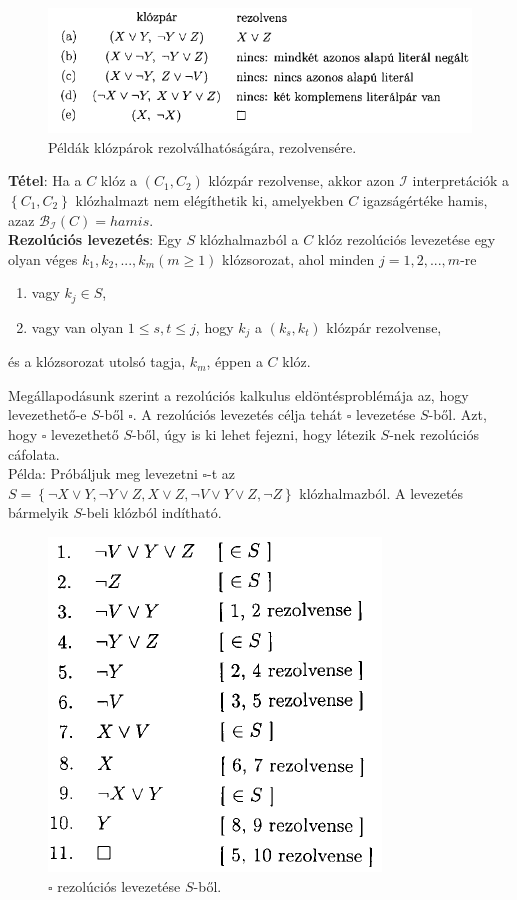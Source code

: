 \documentclass[margin=0px]{article}
\begin{document}
	\begin{figure}[H]
		\centering
		\includegraphics[width=0.7\linewidth]{img/rezolvens}
		\caption{Példák klózpárok rezolválhatóságára, rezolvensére.}
		\label{fig:rezolvens}
	\end{figure}
	
	\noindent \textbf{Tétel}: Ha a $C$ klóz a $(C_{1},C_{2})$ klózpár rezolvense, akkor azon $\mathcal{I}$ interpretációk
	a $\left\{C_{1}, C_{2}\right\}$ klózhalmazt nem elégíthetik ki, amelyekben $C$ igazságértéke hamis, azaz
	$\mathcal{B}_{\mathcal{I}}(C) = hamis$.\\
	
	\noindent \textbf{Rezolúciós levezetés}: Egy $S$ klózhalmazból a $C$ klóz rezolúciós levezetése egy olyan véges
	$k_{1}, k_{2}, ... ,k_{m} (m \geq 1)$ klózsorozat, ahol minden $j = 1, 2, ..., m$-re
	
	\begin{enumerate}
		\item	vagy $k_{j} \in S$,
		
		\item	vagy van olyan $1 \leq s,t \le j$, hogy $k_{j}$ a $(k_{s}, k_{t})$ klózpár rezolvense,
	\end{enumerate}
	
	\noindent és a klózsorozat utolsó tagja, $k_{m}$, éppen a $C$ klóz.
	 
	Megállapodásunk szerint a rezolúciós kalkulus eldöntésproblémája az, hogy levezethető-e $S$-ből $\square$. A
	rezolúciós levezetés célja tehát $\square$ levezetése $S$-ből. Azt, hogy $\square$ levezethető $S$-ből,
	úgy is ki lehet fejezni, hogy létezik $S$-nek rezolúciós cáfolata.\\
	
	\noindent Példa: Próbáljuk meg levezetni $\square$-t az
	$S = \left\{\neg X \vee Y, \neg Y \vee Z, X \vee Z, \neg V \vee Y \vee Z, \neg Z \right\}$
	klózhalmazból. A levezetés bármelyik $S$-beli klózból indítható.
	
	\begin{figure}[H]
		\centering
		\includegraphics[width=0.4\linewidth]{img/rezoluciopelda}
		\caption{$\square$ rezolúciós levezetése $S$-ből.}
		\label{fig:rezoluciopelda}
	\end{figure}
	 
\end{document}
